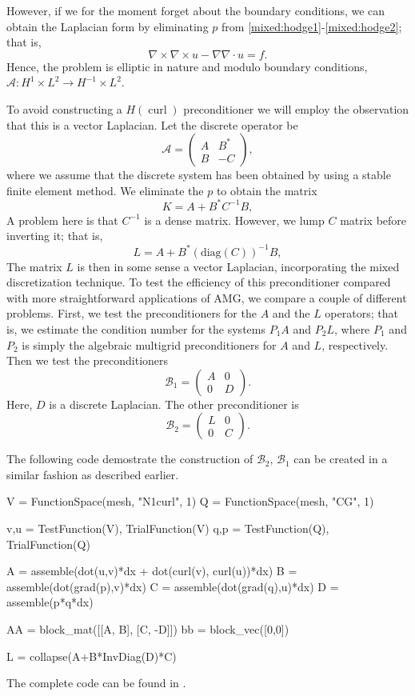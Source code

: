 However, if we for the moment forget about the boundary conditions,
we can obtain the Laplacian form  by eliminating $p$
from \eqref{mixed:hodge1}-\eqref{mixed:hodge2}; that is,
\[
\nabla \times \nabla \times u - \nabla \nabla \cdot u = f .
\]
Hence, the problem is elliptic
in nature and modulo boundary conditions,  $\mathcal{A}: H^1 \times L^2 \rightarrow  H^{-1} \times L^2$.

To avoid constructing a $H(\operatorname{curl})$ preconditioner we will employ
the observation that this is a vector Laplacian.
Let the discrete operator be
\[
\mathcal{A}  =
\begin{pmatrix} A & B^* \\ B & -C \end{pmatrix},
\]
where we assume that the discrete system has been obtained by using a stable finite
element method. We eliminate the $p$ to obtain the matrix
\[
K  = A +  B^* C^{-1} B,
\]
A problem here is that $C^{-1}$ is a dense matrix. However, we lump $C$ matrix before inverting it; that is,
\[
L  = A +  B^* (\mathrm{diag}(C))^{-1} B,
\]
The matrix $L$ is then in some sense a vector Laplacian,
incorporating the mixed discretization technique.  To test the
efficiency of this preconditioner compared with more straightforward
applications of AMG, we compare a couple of different problems.
First, we test the preconditioners for the $A$ and the $L$
operators; that is, we estimate the condition number for the systems
$P_1 A$ and $P_2 L$, where $P_1$ and $P_2$ is simply the algebraic
multigrid preconditioners for $A$ and $L$, respectively.  Then we
test the preconditioners
\[
\mathcal{B}_1  =
\begin{pmatrix} A & 0  \\ 0  & D \end{pmatrix}.
\]
Here, $D$ is a discrete Laplacian. The other preconditioner is
\[
\mathcal{B}_2  =
\begin{pmatrix} L & 0  \\ 0  & C \end{pmatrix}.
\]

The following code demostrate the construction of $\mathcal{B}_2$,
$\mathcal{B}_1$ can be created in a similar fashion as described earlier.
\begin{python}
V = FunctionSpace(mesh, "N1curl", 1)
Q = FunctionSpace(mesh, "CG", 1)

v,u = TestFunction(V), TrialFunction(V)
q,p = TestFunction(Q), TrialFunction(Q)

A = assemble(dot(u,v)*dx + dot(curl(v), curl(u))*dx)
B = assemble(dot(grad(p),v)*dx)
C = assemble(dot(grad(q),u)*dx)
D = assemble(p*q*dx)

AA = block_mat([[A,  B],
                [C, -D]])
bb = block_vec([0,0])

L = collapse(A+B*InvDiag(D)*C)
\end{python}
The complete code can be found in .


